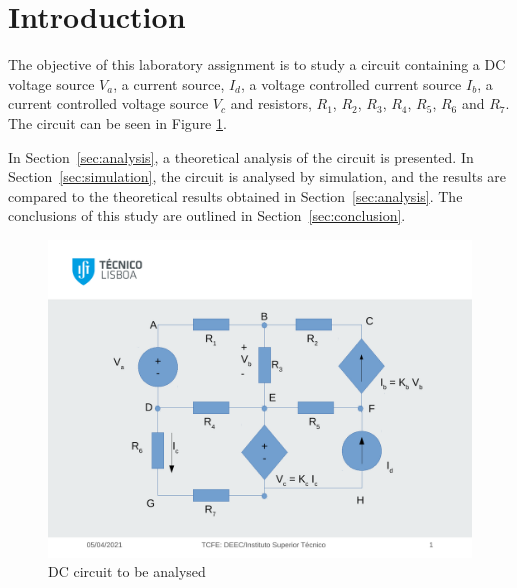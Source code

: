 \section{Introduction}
\label{sec:introduction}

The objective of this laboratory assignment is to study a circuit containing a
DC voltage source $V_a$, a current source, $I_d$, a voltage controlled current
source $I_b$, a current controlled voltage source $V_c$ and resistors,
$R_1$, $R_2$, $R_3$, $R_4$, $R_5$, $R_6$ and $R_7$. The circuit can be seen in Figure \ref{fig:t1}.

In Section~\ref{sec:analysis}, a theoretical analysis of the circuit is
presented. In Section~\ref{sec:simulation}, the circuit is analysed by
simulation, and the results are compared to the theoretical results obtained in
Section~\ref{sec:analysis}. The conclusions of this study are outlined in
Section~\ref{sec:conclusion}.

\begin{figure}[H] \centering
\includegraphics[width=1\linewidth]{t1.pdf}
\caption{DC circuit to be analysed}
\label{fig:t1}
\end{figure}

